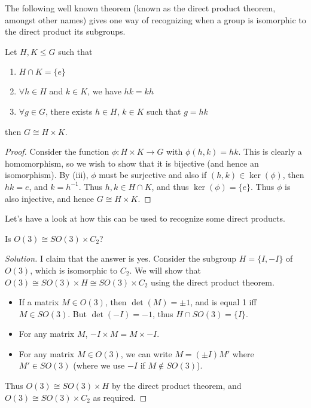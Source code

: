 \documentclass[11pt]{article}
\begin{document}
The following well known theorem (known as the direct product theorem, amongst other names) gives one way of recognizing when a group is isomorphic to the direct product its subgroups.

\begin{theorem}
	Let $H, K \leq G$ such that
	\begin{enumerate}[label=(\roman*)]
		\item $H \cap K = \{e\}$
		\item $\forall h \in H$ and $k \in K$, we have $hk = kh$
		\item $\forall g \in G$, there exists $h \in H$, $k \in K$ such that $g = hk$
	\end{enumerate}
	then $G \cong H \times K$.
\end{theorem}
\begin{proof}
	Consider the function $\phi: H \times K \rightarrow G$ with $\phi(h, k) = hk$. This is clearly a homomorphism, so we wish to show that it is bijective (and hence an isomorphism). By (iii), $\phi$ must be surjective and also if $(h, k) \in \operatorname{ker}(\phi)$, then $hk = e$, and $k = h^{-1}$. Thus $h, k \in H \cap K$, and thus $\ker(\phi) = \{e\}$. Thus $\phi$ is also injective, and hence $G \cong H \times K$.
\end{proof}

Let's have a look at how this can be used to recognize some direct products.

\begin{example}
	Is $O(3) \cong SO(3) \times C_2$?
\end{example}
\begin{proof}[Solution]
	I claim that the answer is yes. 
	Consider the subgroup $H = \{I, -I\}$ of $O(3)$, which is isomorphic to $C_2$. We will show that $O(3) \cong SO(3) \times H \cong SO(3) \times C_2$ using the direct product theorem.
	\begin{itemize}
		\item If a matrix $M \in O(3)$, then $\det(M) = \pm 1$, and is equal 1 iff $M \in SO(3)$. But $\det(-I) = -1$, thus $H \cap SO(3) = \{I \}$.
		\item For any matrix $M$, $-I \times M = M \times -I$.
		\item For any matrix $M \in O(3)$, we can write $M = (\pm I) M'$ where $M' \in SO(3)$ (where we use $-I$ if $M \not \in SO(3)$).
	\end{itemize}
	Thus $O(3) \cong SO(3) \times H$ by the direct product theorem, and $O(3) \cong SO(3) \times C_2$ as required.
\end{proof}
\end{document}
